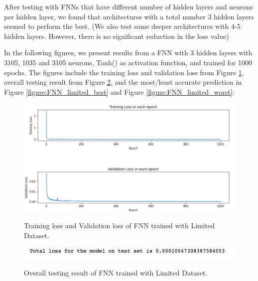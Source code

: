 After testing with FNNs that have different number of hidden layers and neurons per hidden layer, we found that architectures with a total number 3 hidden layers seemed to perform the best. (We also test some deeper architectures with 4-5 hidden layers. However, there is no significant reduction in the loss value)

In the following figures, we present results from a FNN with 3 hidden layers with 3105, 1035 and 3105 neurons, Tanh() as activation function, and trained for 1000 epochs. The figures include the training loss and validation loss from Figure \ref{figure:FNN_limited_losses}, overall testing result from Figure \ref{figure:FNN_limited_testing}, and the most/least accurate prediction in Figure \ref{figure:FNN_limited_best} and Figure \ref{figure:FNN_limited_worst}:

\begin{figure}[H]
    \caption{Training loss and Validation loss of FNN trained with Limited Dataset.}
    \includegraphics[scale=0.6]{figures/mantle_convection_images/limited_dataset/FNN_trainingData.png}
    \label{figure:FNN_limited_losses}
\end{figure}

\begin{figure}[H]
    \caption{Overall testing result of FNN trained with Limited Dataset.}
    \includegraphics[scale=0.8]{figures/mantle_convection_images/limited_dataset/FNN_OverallTesting.png}
    \label{figure:FNN_limited_testing}
\end{figure}

